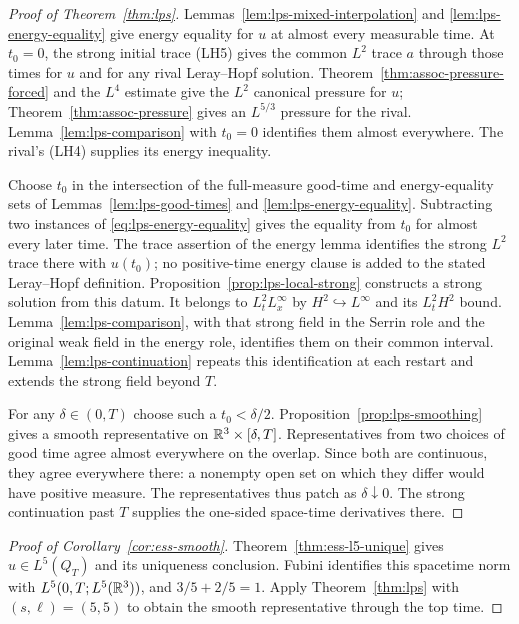 \documentclass[11pt,letterpaper]{article}
\numberwithin{equation}{section}
\theoremstyle{plain}
\theoremstyle{definition}
\theoremstyle{remark}
\begin{document}
\begin{proof}[Proof of Theorem~\ref{thm:lps}]
Lemmas~\ref{lem:lps-mixed-interpolation} and
\ref{lem:lps-energy-equality} give energy equality for $u$ at almost
every measurable time. At $t_0=0$, the strong initial trace (LH5)
gives the common $L^2$ trace $a$ through those times for $u$ and for
any rival Leray--Hopf solution. Theorem~\ref{thm:assoc-pressure-forced}
and the $L^4$ estimate give the $L^2$ canonical pressure for $u$;
Theorem~\ref{thm:assoc-pressure} gives an $L^{5/3}$ pressure for the
rival. Lemma~\ref{lem:lps-comparison} with $t_0=0$ identifies them
almost everywhere. The rival's (LH4) supplies its energy inequality.

Choose $t_0$ in the intersection of the full-measure good-time and
energy-equality sets of Lemmas~\ref{lem:lps-good-times} and
\ref{lem:lps-energy-equality}. Subtracting two instances of
\eqref{eq:lps-energy-equality} gives the equality from $t_0$ for
almost every later time. The trace assertion of the energy lemma
identifies the strong $L^2$ trace there with $u(t_0)$; no positive-time
energy clause is added to the stated Leray--Hopf definition.
Proposition~\ref{prop:lps-local-strong} constructs a strong solution
from this datum. It belongs to $L^2_tL^\infty_x$ by
$H^2\hookrightarrow L^\infty$ and its $L^2_tH^2$ bound.
Lemma~\ref{lem:lps-comparison}, with that strong field in the Serrin
role and the original weak field in the energy role, identifies them
on their common interval. Lemma~\ref{lem:lps-continuation} repeats
this identification at each restart and extends the strong field
beyond $T$.

For any $\delta\in(0,T)$ choose such a $t_0<\delta/2$.
Proposition~\ref{prop:lps-smoothing} gives a smooth representative on
$\mathbb{R}^3\times[\delta,T]$. Representatives from two choices of good
time agree almost everywhere on the overlap. Since both are
continuous, they agree everywhere there: a nonempty open set on
which they differ would have positive measure. The representatives
thus patch as $\delta\downarrow0$. The strong continuation past $T$
supplies the one-sided space-time derivatives there.
\end{proof}

\begin{proof}[Proof of Corollary~\ref{cor:ess-smooth}]
Theorem~\ref{thm:ess-l5-unique} gives $u\in L^5(Q_T)$ and its
uniqueness conclusion. Fubini identifies this spacetime norm with
$L^5(0,T;L^5(\mathbb{R}^3))$, and $3/5+2/5=1$. Apply
Theorem~\ref{thm:lps} with $(s,\ell)=(5,5)$ to obtain the smooth
representative through the top time.
\end{proof}
\end{document}
